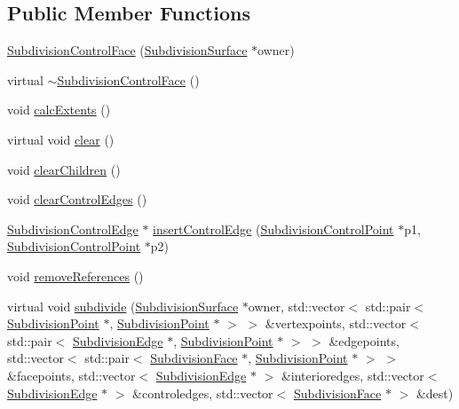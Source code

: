 \subsection*{Public Member Functions}
\begin{DoxyCompactItemize}
\item 
\hyperlink{classShipCADGeometry_1_1SubdivisionControlFace_a9316495869082b0e3e27092118913644}{Subdivision\-Control\-Face} (\hyperlink{classShipCADGeometry_1_1SubdivisionSurface}{Subdivision\-Surface} $\ast$owner)
\item 
virtual \hyperlink{classShipCADGeometry_1_1SubdivisionControlFace_a7b092e764ec2708674afdb210196f761}{$\sim$\-Subdivision\-Control\-Face} ()
\item 
void \hyperlink{classShipCADGeometry_1_1SubdivisionControlFace_a611c74ce3f346a745d4a694f5aab4ec2}{calc\-Extents} ()
\item 
virtual void \hyperlink{classShipCADGeometry_1_1SubdivisionControlFace_ad168e31f0ef2537b3cd0f58b0c1c54e2}{clear} ()
\item 
void \hyperlink{classShipCADGeometry_1_1SubdivisionControlFace_a1501212af025c7e33ede929d50a76651}{clear\-Children} ()
\item 
void \hyperlink{classShipCADGeometry_1_1SubdivisionControlFace_ad8d1c627c87a5f151610b446dd889bf7}{clear\-Control\-Edges} ()
\item 
\hyperlink{classShipCADGeometry_1_1SubdivisionControlEdge}{Subdivision\-Control\-Edge} $\ast$ \hyperlink{classShipCADGeometry_1_1SubdivisionControlFace_af585a1c8300791375b2df87fe2ebc4f5}{insert\-Control\-Edge} (\hyperlink{classShipCADGeometry_1_1SubdivisionControlPoint}{Subdivision\-Control\-Point} $\ast$p1, \hyperlink{classShipCADGeometry_1_1SubdivisionControlPoint}{Subdivision\-Control\-Point} $\ast$p2)
\item 
void \hyperlink{classShipCADGeometry_1_1SubdivisionControlFace_a1c5253075cbe1f05ba004bee4edb8698}{remove\-References} ()
\item 
virtual void \hyperlink{classShipCADGeometry_1_1SubdivisionControlFace_acf4e7f0d422bdc22daebe53d18383d38}{subdivide} (\hyperlink{classShipCADGeometry_1_1SubdivisionSurface}{Subdivision\-Surface} $\ast$owner, std\-::vector$<$ std\-::pair$<$ \hyperlink{classShipCADGeometry_1_1SubdivisionPoint}{Subdivision\-Point} $\ast$, \hyperlink{classShipCADGeometry_1_1SubdivisionPoint}{Subdivision\-Point} $\ast$ $>$ $>$ \&vertexpoints, std\-::vector$<$ std\-::pair$<$ \hyperlink{classShipCADGeometry_1_1SubdivisionEdge}{Subdivision\-Edge} $\ast$, \hyperlink{classShipCADGeometry_1_1SubdivisionPoint}{Subdivision\-Point} $\ast$ $>$ $>$ \&edgepoints, std\-::vector$<$ std\-::pair$<$ \hyperlink{classShipCADGeometry_1_1SubdivisionFace}{Subdivision\-Face} $\ast$, \hyperlink{classShipCADGeometry_1_1SubdivisionPoint}{Subdivision\-Point} $\ast$ $>$ $>$ \&facepoints, std\-::vector$<$ \hyperlink{classShipCADGeometry_1_1SubdivisionEdge}{Subdivision\-Edge} $\ast$ $>$ \&interioredges, std\-::vector$<$ \hyperlink{classShipCADGeometry_1_1SubdivisionEdge}{Subdivision\-Edge} $\ast$ $>$ \&controledges, std\-::vector$<$ \hyperlink{classShipCADGeometry_1_1SubdivisionFace}{Subdivision\-Face} $\ast$ $>$ \&dest)

\end{DoxyCompactItemize}
